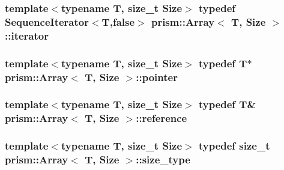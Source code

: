 \subsubsection[{\texorpdfstring{iterator}{iterator}}]{\setlength{\rightskip}{0pt plus 5cm}template$<$typename T, size\+\_\+t Size$>$ typedef {\bf Sequence\+Iterator}$<$T,false$>$ {\bf prism\+::\+Array}$<$ T, {\bf Size} $>$\+::{\bf iterator}}\hypertarget{classprism_1_1_array_a097ed322849188b1c8a8697405160638}{}\label{classprism_1_1_array_a097ed322849188b1c8a8697405160638}
\subsubsection[{\texorpdfstring{pointer}{pointer}}]{\setlength{\rightskip}{0pt plus 5cm}template$<$typename T, size\+\_\+t Size$>$ typedef T$\ast$ {\bf prism\+::\+Array}$<$ T, {\bf Size} $>$\+::{\bf pointer}}\hypertarget{classprism_1_1_array_a06cca3e8ac92f77d0068246d715bb0e4}{}\label{classprism_1_1_array_a06cca3e8ac92f77d0068246d715bb0e4}
\subsubsection[{\texorpdfstring{reference}{reference}}]{\setlength{\rightskip}{0pt plus 5cm}template$<$typename T, size\+\_\+t Size$>$ typedef T\& {\bf prism\+::\+Array}$<$ T, {\bf Size} $>$\+::{\bf reference}}\hypertarget{classprism_1_1_array_a00d78e61fb0a47489aff55b88ae9ebaa}{}\label{classprism_1_1_array_a00d78e61fb0a47489aff55b88ae9ebaa}
\subsubsection[{\texorpdfstring{size\+\_\+type}{size_type}}]{\setlength{\rightskip}{0pt plus 5cm}template$<$typename T, size\+\_\+t Size$>$ typedef size\+\_\+t {\bf prism\+::\+Array}$<$ T, {\bf Size} $>$\+::{\bf size\+\_\+type}}\hypertarget{classprism_1_1_array_a91c89205e41d0e7825562343bfde3f1b}{}\label{classprism_1_1_array_a91c89205e41d0e7825562343bfde3f1b}
